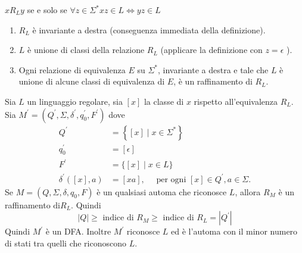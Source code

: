 $x R_{L} y$ se e solo se $\forall z \in \Sigma^{*} x z \in L \Leftrightarrow y z \in L$
\begin{enumerate}
    \item $R_{L}$ è invariante a destra (conseguenza immediata della definizione).
    \item $L$ è unione di classi della relazione $R_{L}$ (applicare la definizione con $z=\epsilon$ ).
    \item Ogni relazione di equivalenza $E$ su $\Sigma^{*}$, invariante a destra e tale che $L$ è unione di alcune classi di equivalenza di $E$, è un raffinamento di $R_{L}$.
\end{enumerate}
Sia $L$ un linguaggio regolare, sia $[x]$ la classe di $x$ rispetto all'equivalenza $R_{L}$.
Sia $M^{\prime}=\left(Q^{\prime}, \Sigma, \delta^{\prime}, q_{0}^{\prime}, F^{\prime}\right)$ dove
$$
\begin{aligned}
Q^{\prime} &=\left\{[x] \mid x \in \Sigma^{*}\right\} \\
q_{0}^{\prime} &=[\epsilon] \\
F^{\prime} &=\{[x] \mid x \in L\} \\
\delta^{\prime}([x], a) &=[x a], \quad \text { per ogni }[x] \in Q^{\prime}, a \in \Sigma .
\end{aligned}
$$
Se $M=\left(Q, \Sigma, \delta, q_{0}, F\right)$ è un qualsiasi automa che riconosce $L$, allora $R_{M}$ è un raffinamento $\mathrm{di} R_{L}$. Quindi
$$
|Q| \geq \text { indice di } R_{M} \geq \text { indice di } R_{L}=\left|Q^{\prime}\right|
$$
Quindi $M^{\prime}$ è un DFA. Inoltre $M^{\prime}$ riconosce $L$ ed è l'automa con il minor numero di stati tra quelli che riconoscono $L$.



\let\cleardoublepage\clearpage

